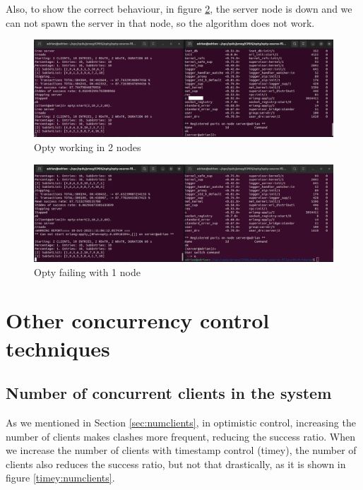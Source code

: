 \documentclass[a4paper, 10pt]{article}
\begin{document}
Also, to show the correct behaviour, in figure \ref{fig:1node}, the server node is down and we can not spawn the server in that node, so the algorithm does not work.



\begin{figure}[H]
  \centering
  \includegraphics[width=0.95\linewidth]{images/optyWorking.png}
    \caption{Opty working in 2 nodes}
    \label{fig:2nodes}
\end{figure} 


\begin{figure}[H]
  \centering
  \includegraphics[width=0.95\linewidth]{images/opty1node.png}
    \caption{Opty failing with 1 node}
    \label{fig:1node}
\end{figure} 

\clearpage
\section{Other concurrency control techniques}


\subsection{Number of concurrent clients in the system}\label{timey-current-clients}

As we mentioned in Section \ref{sec:numclients}, in optimistic control, increasing the number of clients makes clashes more frequent, reducing the success ratio. When we increase the number of clients with timestamp control (timey), the number of clients also reduces the success ratio, but not that drastically, as it is shown in figure \ref{timey:numclients}. 
\end{document}
